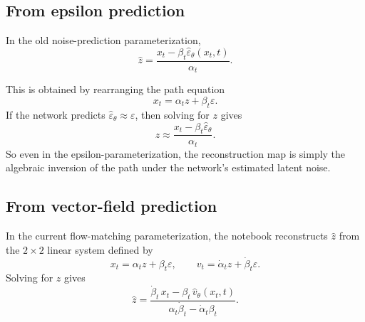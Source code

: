 \documentclass[11pt]{article}
\newcommand{\e}{\varepsilon}
\begin{document}
\subsection{From epsilon prediction}

In the old noise-prediction parameterization,
\begin{equation}
  \hat z = \frac{x_t - \beta_t \hat\e_\theta(x_t,t)}{\alpha_t}.
\end{equation}

This is obtained by rearranging the path equation
\begin{equation}
  x_t = \alpha_t z + \beta_t\e.
\end{equation}
If the network predicts \(\hat\e_\theta\approx \e\), then solving for \(z\) gives
\begin{equation}
  z \approx \frac{x_t-\beta_t\hat\e_\theta}{\alpha_t}.
\end{equation}
So even in the epsilon-parameterization, the reconstruction map is simply the algebraic inversion of the path under the network's estimated latent noise.

\subsection{From vector-field prediction}

In the current flow-matching parameterization, the notebook reconstructs \(\hat z\) from the \(2\times 2\) linear system defined by
\begin{equation}
  x_t = \alpha_t z + \beta_t \e,
  \qquad
  v_t = \dot\alpha_t z + \dot\beta_t \e.
\end{equation}
Solving for \(z\) gives
\begin{equation}
  \hat z
  =
  \frac{\dot\beta_t\,x_t - \beta_t\,\hat v_\theta(x_t,t)}
       {\alpha_t\dot\beta_t - \dot\alpha_t \beta_t}.
\end{equation}
\end{document}
